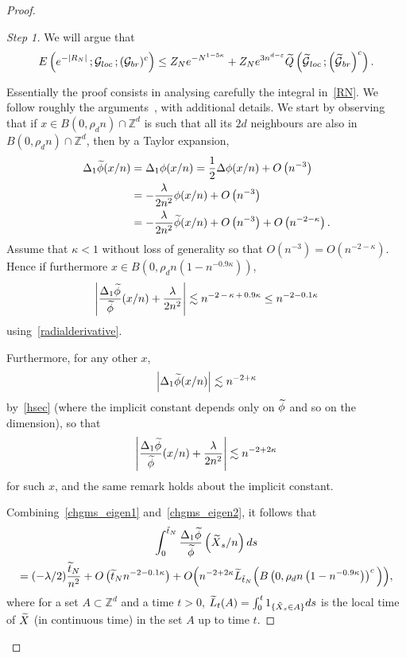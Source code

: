 \documentclass[10pt]{amsart}
\theoremstyle{definition}\newtheorem{defi}[theo]{Definition}\newtheorem{rema}[theo]{Remark}\newtheorem{exam}[theo]{Example}\newtheorem{exem}[theo]{Example}\newtheorem{nota}[theo]{Notation}
\newenvironment{step}[1]{\begin{proof}[#1]}{\let\qed\relax\end{proof}}
\newcommand*\Z {{\mathbb Z}}
\newcommand*\E {{E}}
\newcommand{\cG}{\mathcal{G}}
\newcommand*\Q{{Q}}
\newcommand*\eps{\varepsilon}
\let\oldtilde\tilde
\renewcommand*{\tilde}[1]{\mathchoice{\widetilde{#1}}{\widetilde{#1}}{\oldtilde{#1}}{\oldtilde{#1}}}\let\oldhat\hat
\renewcommand*{\hat}[1]{\mathchoice{\widehat{#1}}{\widehat{#1}}{\oldhat{#1}}{\oldhat{#1}}}\let\oldexists\exists
\renewcommand*{\exists}{\mathrel{\oldexists}}
\begin{document}
\begin{proof}
\begin{step}{Step 1} We will argue that
\begin{equation}\label{step1}
\E\left(e^{- |R_N|}\,; \cG_{loc}\,; (\cG_{br})^c\right) \le Z_N e^{- N^{1- 5 \kappa}} + Z_N e^{3 n^{d- \eps}} \tilde \Q\left(\tilde \cG_{loc}\,; \left(\tilde \cG_{br}\right)^c\right).
\end{equation}



Essentially the proof consists in analysing carefully the integral in~\eqref{RN}. We follow roughly the arguments~\cite[see equations~(4.3) and (4.4)]{BO}, with additional details. We start by observing that if $x \in B(0, \rho_d n) \cap \Z^d$ is such that all its $2d$ neighbours are also in $B(0, \rho_d n) \cap \Z^d$, then by a Taylor expansion,
\begin{align*}
\Delta_1 \tilde \phi (x/n) &= \Delta_1 \phi(x/n) = \frac12 \Delta \phi(x/n) + O\left(n^{-3}\right) \\
& = - \frac{\lambda}{2n^2} \phi (x/n) + O \left(n^{ - 3}\right)\\
& = - \frac{\lambda}{2n^2} \tilde \phi (x/n) + O \left(n^{- 3}\right) + O\left(n^{ - 2 - \kappa}\right).
\end{align*}
Assume that $\kappa <1$ without loss of generality so that $O(n^{-3}) = O (n^{ - 2 - \kappa})$. Hence if furthermore $x \in B(0, \rho_d n(1- n^{ - 0.9\kappa}))$,
\begin{equation}\label{chgms_eigen1}
\left| \frac{\Delta_1 \tilde \phi}{\tilde \phi} (x/n) + \frac{\lambda}{2n^2} \right | \lesssim n^{-2\,-\,\kappa\,+\,0.9\kappa} \le n^{ - 2 - 0.1 \kappa}
\end{equation}
using~\eqref{radialderivative}.

Furthermore, for any other $x$,
\[
\left|\Delta_1 \tilde \phi (x/n)\right| \lesssim n^{ - 2 + \kappa}
\]
by~\eqref{hsec} (where the implicit constant depends only on $\tilde \phi$ and so on the dimension), so that
\begin{equation}\label{chgms_eigen2}
\left| \frac{\Delta_1 \tilde \phi}{\tilde \phi} (x/n) + \frac{\lambda}{2n^2} \right| \lesssim n^{-2+ 2\kappa}
\end{equation}
for such $x$, and the same remark holds about the implicit constant.

Combining~\eqref{chgms_eigen1} and~\eqref{chgms_eigen2}, it follows that
\begin{multline}\label{chgmeas_int}
\int_0^{\tilde t_N} \frac{\Delta_1 \tilde \phi}{\tilde \phi}\left(\tilde X_s/n\right)ds \\ 
=(- \lambda/2)\frac{{\tilde t_N}}{n^2} + O \left(\tilde t_N n^{-2 -0.1 \kappa}\right) + O \Big(n^{-2 + 2\kappa}\tilde L_{\tilde t_N} \Big(B\left(0, \rho_d n\left(1- n^{ - 0.9 \kappa}\right)\right)^c\Big)\Big),
\end{multline}
where for a set $A \subset \Z^d$ and a time $t>0$, $\tilde L_t(A) = \int_0^t 1_{\{ \tilde X_s \in A\}} ds$ is the local time of $\tilde X$ (in continuous time) in the set $A$ up to time $t$.


\end{step}
\end{proof}
\end{document}
